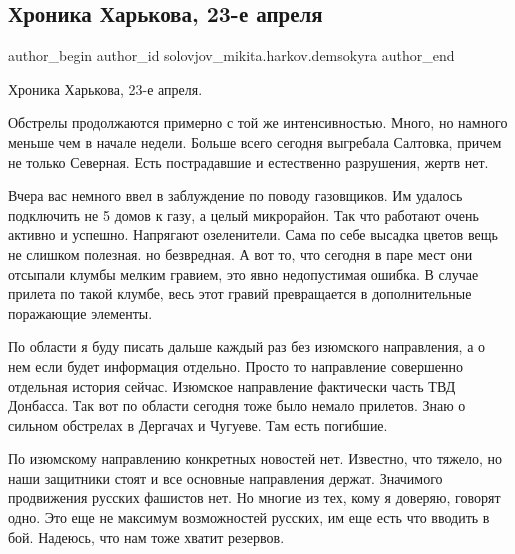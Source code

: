  
 
 
 
 
 
\subsection{Хроника Харькова, 23-е апреля}
\label{sec:23_04_2022.fb.solovjov_mikita.harkov.demsokyra.1.hronika}
 
\ifcmt
 author_begin
   author_id solovjov_mikita.harkov.demsokyra
 author_end
\fi

Хроника Харькова, 23-е апреля. 

Обстрелы продолжаются примерно с той же интенсивностью. Много, но намного
меньше чем в начале недели. Больше всего сегодня выгребала Салтовка, причем не
только Северная. Есть пострадавшие и естественно разрушения, жертв нет. 

Вчера вас немного ввел в заблуждение по поводу газовщиков. Им удалось
подключить не 5 домов к газу, а целый микрорайон. Так что работают очень
активно и успешно. Напрягают озеленители. Сама по себе высадка цветов вещь не
слишком полезная. но безвредная. А вот то, что сегодня в паре мест они отсыпали
клумбы мелким гравием, это явно недопустимая ошибка. В случае прилета по такой
клумбе, весь этот гравий превращается в дополнительные поражающие элементы. 

По области я буду писать дальше каждый раз без изюмского направления, а о нем
если будет информация отдельно. Просто то направление совершенно отдельная
история сейчас. Изюмское направление фактически часть ТВД Донбасса. Так вот по
области сегодня тоже было немало прилетов. Знаю о сильном обстрелах в Дергачах
и Чугуеве. Там есть погибшие. 

По изюмскому направлению конкретных новостей нет. Известно, что тяжело, но наши
защитники стоят и все основные направления держат. Значимого продвижения
русских фашистов нет. Но многие из тех, кому я доверяю, говорят одно. Это еще
не максимум возможностей русских, им еще есть что вводить в бой. Надеюсь, что
нам тоже хватит резервов. 

